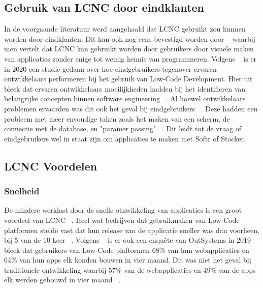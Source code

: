 \subsection*{Gebruik van LCNC door eindklanten}
\label{sub:gebruik-van-lcnc-door-eindklanten}
In de voorgaande literatuur werd aangehaald dat LCNC gebruikt zou kunnen worden door eindklanten. Dit kan ook nog eens bevestigd
worden door ~\textcite{Yan2021} waarbij men vertelt dat LCNC kan gebruikt worden door gebruikers door visuele maken van applicaties zonder enige tot weinig kennis van programmeren. 
Volgens ~\textcite{Hintsch2021} is er in 2020 een studie gedaan over hoe eindgebruikers tegenover ervaren ontwikkelaars performeren bij het gebruik van Low-Code Development.
Hier uit bleek dat ervaren ontwikkelaars moeilijkheden hadden bij het identificren van belangrijke concepten binnen software engineering ~\autocite{Hintsch2021}. Al 
hoewel ontwikkelaars problemen ervaarden was dit ook het geval bij eindgebruikers ~\autocite{Hintsch2021}. Deze hadden een probleem met meer envoudige taken zoals het maken van een scherm,
de connectie met de database, en "paramer passing" ~\autocite{Hintsch2021}. Dit leidt tot de vraag of eindgebruikers wel in staat zijn om applicaties te maken met Softr of Stacker.
\subsection*{LCNC Voordelen}
\label{sub:lcnc-voordelen}
\subsubsection*{Snelheid}
\label{sub:snelheid}
De mindere werklast door de snelle otnwikkeling van applicaties is een groot voordeel van LCNC ~\autocite{Adrian_2020}.
Heel wat bedrijven dat gebruikmaken van Low-Code platformen stelde vast dat hun release van de applicatie sneller was dan voorheen, bij 5 van de 10 keer ~\autocite{Yan2021}.
Volgens ~\textcite{Yan2021} is er ook een enquête van OutSystems in 2019 bleek dat gebruikers van Low-Code plaftormen 68\% van hun webapplicaties en 64\% van hun apps elk konden bouwen in vier maand.
Dit was niet het geval bij traditionele ontwikkeling waarbij 57\% van de webapplicaties en 49\% van de apps elk werden gebouwd in vier maand ~\autocite{Yan2021}.


